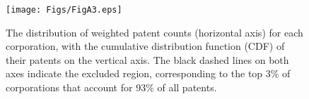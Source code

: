 \begin{figure}[ht]
    \centering
    \texttt{[image: Figs/FigA3.eps]}
    \caption{The distribution of weighted patent counts (horizontal axis) for each corporation, with the cumulative distribution function (CDF) of their patents on the vertical axis. The black dashed lines on both axes indicate the excluded region, corresponding to the top 3\% of corporations that account for 93\% of all patents.}
    \label{fig:patentdistribution}
\end{figure}

